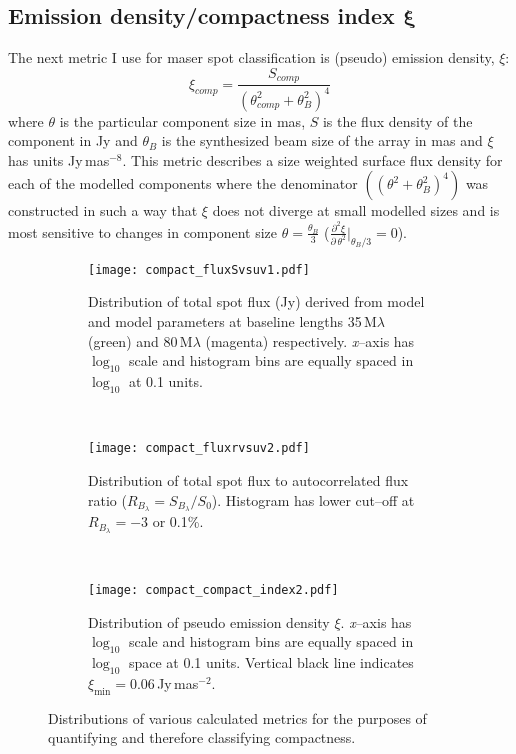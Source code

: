     \subsection{Emission density/compactness index $\boldsymbol{\xi}$}
        The next metric I use for maser spot classification is (pseudo) emission density, $\xi$:
        \begin{equation}
	        \xi_{comp}=\frac{S_{comp}}{(\theta_{comp}^2+\theta_B^2)^4}
        \end{equation}
        where $\theta$ is the particular component size in mas, $S$ is the flux density of the component in Jy and $\theta_B$ is the synthesized beam size of the array in mas and $\xi$ has units Jy\,mas$^{-8}$. This metric describes a size weighted surface flux density for each of the modelled components where the denominator $\left(\left(\theta^2+\theta_B^2\right)^4\right)$ was constructed in such a way that $\xi$ does not diverge at small modelled sizes and is most sensitive to changes in component size $\theta=\frac{\theta_B}{3}$ ($\frac{\partial^2\xi}{\partial\,\theta^2}\rvert_{\theta_B/3}=0$). 
        \begin{figure}[H]
        	\centering
        	\begin{subfigure}[t]{0.7\linewidth}
        		\centering
        		\texttt{[image: compact\_fluxSvsuv1.pdf]}
        		\caption[Global $S_{B_\lambda}$ distribution]{\footnotesize Distribution of total spot flux (Jy) derived from model and model parameters at baseline lengths 35\,M$\lambda$ (green) and 80\,M$\lambda$ (magenta) respectively. {\it x}--axis has $\log_{10}$ scale and histogram bins are equally spaced in $\log_{10}$ at 0.1 units.} \label{fig:compact_metrics1}
        	\end{subfigure}
        	~
        	\begin{subfigure}[t]{0.7\linewidth}
        		\centering
        		\texttt{[image: compact\_fluxrvsuv2.pdf]}
        		\caption[Global $S_{B_\lambda}$ distribution]{\footnotesize Distribution of total spot flux to autocorrelated flux ratio ($R_{B_{\lambda}}=S_{B_{\lambda}}/S_0$). Histogram has lower cut--off at $R_{B_{\lambda}}=-3$ or 0.1\%.  } \label{fig:compact_metrics2}
        	\end{subfigure}
        	~
        	\begin{subfigure}[t]{0.7\linewidth}
        		\centering
        		\texttt{[image: compact\_compact\_index2.pdf]}
        		\caption[Global $\xi_{i}$ distribution]{\footnotesize Distribution of pseudo emission density $\xi$. {\it x}--axis has $\log_{10}$ scale and histogram bins are equally spaced in $\log_{10}$ space at 0.1 units. Vertical black line indicates $\xi_\text{min}=0.06$\,Jy\,mas$^{-2}$.  } \label{fig:compact_metrics3}
        	\end{subfigure}
        	\hfill
        	\caption[Global distributions of $\xi$, $S_{B_\lambda}$ and $R_{B_\lambda}$]{Distributions of various calculated metrics for the purposes of quantifying and therefore classifying compactness.}
        \end{figure}
        
